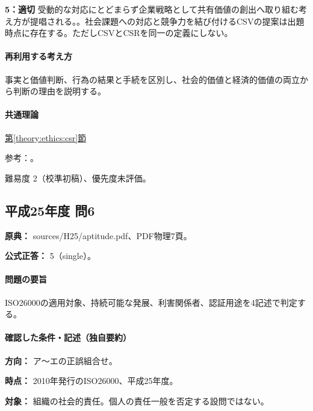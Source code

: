 \noindent\textbf{5：適切} 受動的な対応にとどまらず企業戦略として共有価値の創出へ取り組む考え方が提唱される。。社会課題への対応と競争力を結び付けるCSVの提案は出題時点に存在する。ただしCSVとCSRを同一の定義にしない。\par

\paragraph{再利用する考え方} 事実と価値判断、行為の結果と手続を区別し、社会的価値と経済的価値の両立から判断の理由を説明する。

\paragraph{共通理論} \hyperref[theory:ethics:csr]{第\ref*{theory:ethics:csr}節}

\par 参考：\cite{iso26000,hbs_csv}。

\par 難易度 2（校準初稿）、優先度未評価。

\subsection{平成25年度 問6}
\label{q:h25-reg-apt-06}

\noindent\textbf{原典：} sources/H25/aptitude.pdf、PDF物理7頁。

\textbf{公式正答：} 5（single）。

\paragraph{問題の要旨} ISO26000の適用対象、持続可能な発展、利害関係者、認証用途を4記述で判定する。

\paragraph{確認した条件・記述（独自要約）}\mbox{}\par

\noindent\textbf{方向：} ア〜エの正誤組合せ。\par

\noindent\textbf{時点：} 2010年発行のISO26000、平成25年度。\par

\noindent\textbf{対象：} 組織の社会的責任。個人の責任一般を否定する設問ではない。\par

